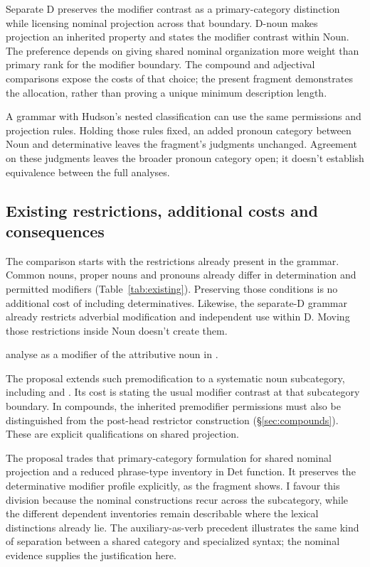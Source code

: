\documentclass[12pt]{article}
\begin{document}
Separate D preserves the modifier contrast as a primary-category distinction while licensing nominal projection across that boundary. D-noun makes projection an inherited property and states the modifier contrast within Noun. The preference depends on giving shared nominal organization more weight than primary rank for the modifier boundary. The compound and adjectival comparisons expose the costs of that choice; the present fragment demonstrates the allocation, rather than proving a unique minimum description length.

A grammar with Hudson's nested classification can use the same permissions and projection rules. Holding those rules fixed, an added pronoun category between Noun and determinative leaves the fragment's judgments unchanged. Agreement on these judgments leaves the broader pronoun category open; it doesn't establish equivalence between the full analyses.

\subsection{Existing restrictions, additional costs and consequences}\label{sec:costs}

The comparison starts with the restrictions already present in the grammar. Common nouns, proper nouns and pronouns already differ in determination and permitted modifiers (Table~\ref{tab:existing}). Preserving those conditions is no additional cost of including determinatives. Likewise, the separate-D grammar already restricts adverbial modification and independent use within D. Moving those restrictions inside Noun doesn't create them.

\textcite[75, n.~3]{payne2010} analyse  as a modifier of the attributive noun  in .

The proposal extends such premodification to a systematic noun subcategory, including  and . Its cost is stating the usual modifier contrast at that subcategory boundary. In compounds, the inherited premodifier permissions must also be distinguished from the post-head restrictor construction (§\ref{sec:compounds}). These are explicit qualifications on shared projection.

The proposal trades that primary-category formulation for shared nominal projection and a reduced phrase-type inventory in Det function. It preserves the determinative modifier profile explicitly, as the fragment shows. I favour this division because the nominal constructions recur across the subcategory, while the different dependent inventories remain describable where the lexical distinctions already lie. The auxiliary-as-verb precedent illustrates the same kind of separation between a shared category and specialized syntax; the nominal evidence supplies the justification here.
\end{document}
